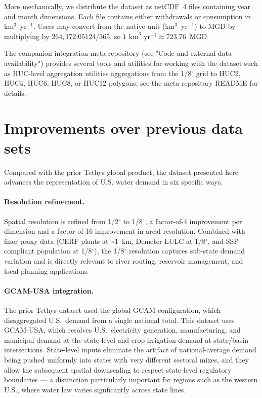 \documentclass[fleqn,10pt]{wlscirep}
\begin{document}


More mechanically, we distribute the dataset as netCDF~4 files containing year and month dimensions. Each file contains either withdrawals or consumption in km$^3$~yr$^{-1}$. Users may convert from the native unit (km$^3$~yr$^{-1}$) to MGD by multiplying by $264{,}172.05124/365$, so $1\text{ km}^3\text{ yr}^{-1} \approx 723.76$~MGD.

The companion integration meta-repository (see "Code and external data availability") provides several tools and utilities for working with the dataset such as HUC-level aggregation utilities aggregations from the 1/8$^{\circ}$ grid to HUC2, HUC4, HUC6, HUC8, or HUC12 polygons; see the meta-repository README for details.

\section*{Improvements over previous data sets} \label{sec:improvements}

Compared with the prior Tethys global product\cite{Khan2023}, the dataset presented here advances the representation of U.S. water demand in six specific ways.

\paragraph{Resolution refinement.} Spatial resolution is refined from 1/2$^{\circ}$ to 1/8$^{\circ}$, a factor-of-4 improvement per dimension and a factor-of-16 improvement in areal resolution. Combined with finer proxy data (CERF plants at \textasciitilde1~km, Demeter LULC at 1/8$^{\circ}$, and SSP-compliant population at 1/8$^{\circ}$), the 1/8$^{\circ}$ resolution captures sub-state demand variation and is directly relevant to river routing, reservoir management, and local planning applications.

\paragraph{GCAM-USA integration.} The prior Tethys dataset used the global GCAM configuration, which disaggregated U.S.~demand from a single national total. This dataset uses GCAM-USA, which resolves U.S.~electricity generation, manufacturing, and municipal demand at the state level and crop irrigation demand at state/basin intersections. State-level inputs eliminate the artifact of national-average demand being pushed uniformly into states with very different sectoral mixes, and they allow the subsequent spatial downscaling to respect state-level regulatory boundaries — a distinction particularly important for regions such as the western U.S., where water law varies signficantly across state lines.
\end{document}

